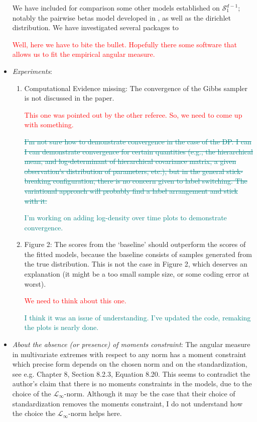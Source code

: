 \documentclass[10pt]{article}
\newcommand{\comment}[1]{\textcolor{teal}{#1}}
\newcommand{\bruno}[1]{\textcolor{red}{#1}}
\begin{document}
\begin{itemize}
    We have included for comparison some other models established on $\mathcal{S}_{1}^{d-1}$;
        notably the pairwise betas model developed in \cite{sabourin2013}, as well
        as the dirichlet distribution.  We have investigated several packages to 


    \bruno{Well, here we have to bite the bullet. Hopefully there some software that allows us
    to fit the empirical angular measure.}

    \item \emph{Experiments}:
        \begin{enumerate}
            \item Computational Evidence missing: The convergence of the Gibbs sampler is not 
            discussed in the paper.

            \bruno{This one was pointed out by the other referee. So, we need to come up with something.}

            \comment{\st{I'm not sure how to demonstrate convergence in the case of the DP.  I can
            I can demonstrate convergence for certain quantities (e.g., the hierarchical mean,
            and log-determinant of hierarchical covariance matrix, a given observation's distribution
            of parameters, etc.), but in the general stick-breaking configuration, there is no concern
            given to label switching.  The variational approach will probably find a label arrangement
            and stick with it.}}

            \comment{I'm working on adding log-density over time plots to demonstrate convergence.}
            
            \item Figure 2: The scores from the ‘baseline’ should outperform the scores of
            the fitted models, because the baseline consists of samples generated from the 
            true distribution. This is not the case in Figure 2, which deserves an explanation 
            (it might be a too small sample size, or some coding error at worst).

            \bruno{We need to think about this one.}

            \comment{I think it was an issue of understanding.  I've updated the code, remaking the plots
            is nearly done.}

        \end{enumerate}

    \item \emph{About the absence (or presence) of moments constraint}: The angular measure in
    multivariate extremes with respect to any norm has a moment constraint which precise form depends 
    on the chosen norm and on the standardization, see e.g. 
    \cite{beirlant2006} Chapter 8, Section 8.2.3, Equation 8.20. 
    This seems to contradict the author’s claim that there is no moments constraints in the models, 
    due to the choice of the $\mathcal{L}_{\infty}$-norm. Although it may be the case that their choice
    of standardization removes the moments constraint, I do not understand how the choice the 
    $\mathcal{L}_{\infty}$-norm helps here.


\end{itemize}
\end{document}

